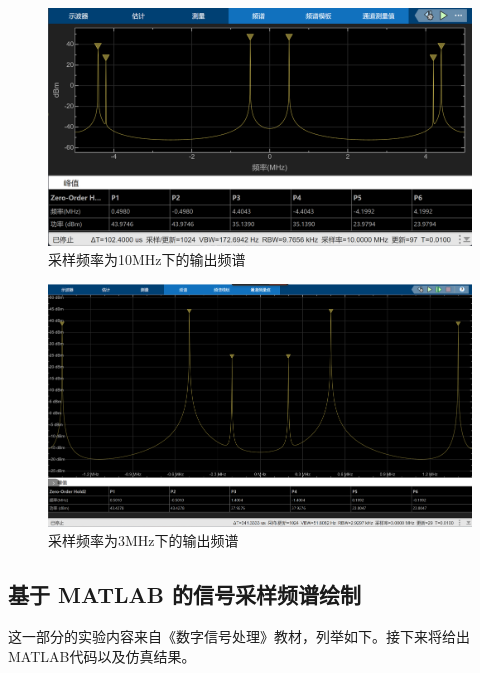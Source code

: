 \documentclass[lang=cn,newtx,10pt,scheme=chinese]{elegantbook}
\begin{document}
\begin{figure}[htbp]
  \centering
  \includegraphics[width=.75\textwidth]{figure/exp1/10M.png}
  \caption{采样频率为10MHz下的输出频谱}
  \label{fig:spectrum10}
\end{figure}
\begin{figure}[htbp]
  \centering
  \includegraphics[width=.75\textwidth]{figure/exp1/3M.png}
  \caption{采样频率为3MHz下的输出频谱}
  \label{fig:spectrum3}
\end{figure}
\subsection{基于 MATLAB 的信号采样频谱绘制}
这一部分的实验内容来自《数字信号处理》教材，列举如下。接下来将给出MATLAB代码以及仿真结果。
\end{document}
